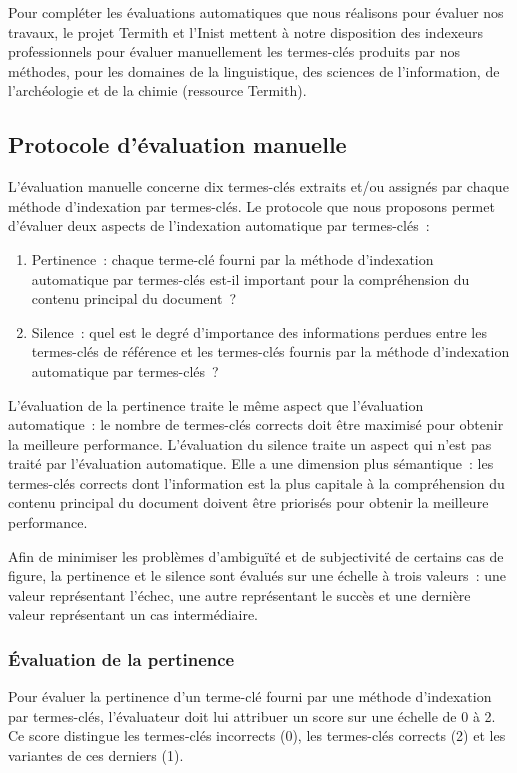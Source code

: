     Pour compléter les évaluations automatiques que nous réalisons pour évaluer
    nos travaux, le projet Termith et l'Inist mettent à notre disposition des
    indexeurs professionnels pour évaluer manuellement les termes-clés produits
    par nos méthodes, pour les domaines de la linguistique, des sciences de
    l'information, de l'archéologie et de la chimie (ressource Termith).

    \subsection{Protocole d'évaluation manuelle}
    \label{subsec:main-automatic_evaluation_of_keyphrase_annotation-methodology-evaluation_protocol}
      L'évaluation manuelle concerne dix termes-clés extraits et/ou assignés par
      chaque méthode d'indexation par termes-clés. Le protocole que nous
      proposons permet d'évaluer deux aspects de l'indexation automatique par
      termes-clés~:
      \begin{enumerate}
        \item{Pertinence~: chaque terme-clé fourni par la méthode d'indexation
              automatique par termes-clés est-il important pour la compréhension
              du contenu principal du document~?}
        \item{Silence~: quel est le degré d'importance des informations perdues
              entre les termes-clés de référence et les termes-clés fournis par
              la méthode d'indexation automatique par termes-clés~?}
      \end{enumerate}
      L'évaluation de la pertinence traite le même aspect que l'évaluation
      automatique~: le nombre de termes-clés corrects doit être maximisé pour
      obtenir la meilleure performance. L'évaluation du silence traite un aspect
      qui n'est pas traité par l'évaluation automatique. Elle a une dimension
      plus sémantique~: les termes-clés corrects dont l'information est la plus
      capitale à la compréhension du contenu principal du document doivent être
      priorisés pour obtenir la meilleure performance.

      Afin de minimiser les problèmes d'ambiguïté et de subjectivité de certains
      cas de figure, la pertinence et le silence sont évalués sur une échelle à
      trois valeurs~: une valeur représentant l'échec, une autre représentant le
      succès et une dernière valeur représentant un cas intermédiaire.

      \subsubsection{Évaluation de la pertinence}
      \label{subsubsec:main-automatic_evaluation_of_keyphrase_annotation-methodology-evaluation_protocol-relevancy}
        Pour évaluer la pertinence d'un terme-clé fourni par une méthode
        d'indexation par termes-clés, l'évaluateur doit lui attribuer un score
        sur une échelle de 0 à 2. Ce score distingue les termes-clés incorrects
        (0), les termes-clés corrects (2) et les variantes de ces derniers (1).

